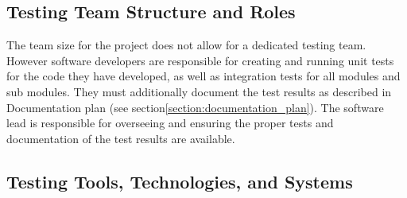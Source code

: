 

\subsection{Testing Team Structure and Roles}

The team size for the project does not allow for a dedicated testing team. However software developers are responsible for creating and running unit tests for the code they have developed, as well as integration tests for all modules and sub modules. They must additionally document the test results as described in Documentation plan (see section\:\ref{section:documentation_plan}). The software lead is responsible for overseeing and ensuring the proper tests and documentation of the test results are available.


\begin{comment}
Please note: The roles listed here might have additional responsibilities outlined in the corresponding plans (Development Plan, Documentation Plan, Communication Plan).

Our testing team includes the following roles:

\begin{itemize}
\item \textbf{Testing Team Leader:} Oversees the overall testing strategy, coordinates with the development team, and ensures thorough and timely testing.
\item \textbf{Test Engineer:} Designs, develops, and executes test cases. They are also responsible for documenting and communicating the results to the team.
\end{itemize}
\end{comment}

\subsection{Testing Tools, Technologies, and Systems}

